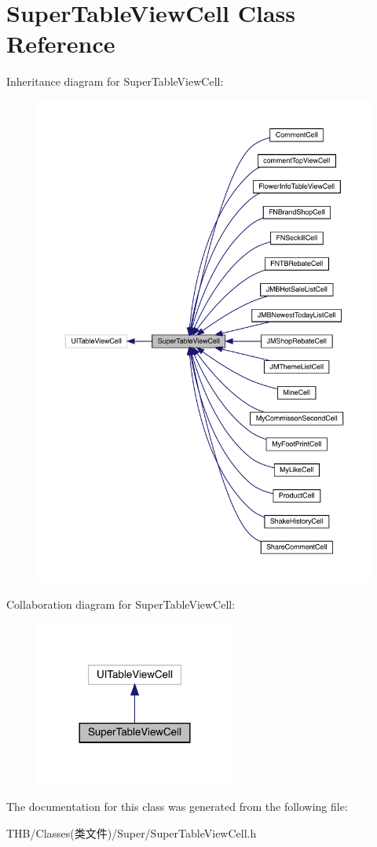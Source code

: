 \hypertarget{interface_super_table_view_cell}{}\section{Super\+Table\+View\+Cell Class Reference}
\label{interface_super_table_view_cell}


Inheritance diagram for Super\+Table\+View\+Cell\+:\nopagebreak
\begin{figure}[H]
\begin{center}
\leavevmode
\includegraphics[width=350pt]{interface_super_table_view_cell__inherit__graph}
\end{center}
\end{figure}


Collaboration diagram for Super\+Table\+View\+Cell\+:\nopagebreak
\begin{figure}[H]
\begin{center}
\leavevmode
\includegraphics[width=185pt]{interface_super_table_view_cell__coll__graph}
\end{center}
\end{figure}


The documentation for this class was generated from the following file\+:\begin{DoxyCompactItemize}
\item 
T\+H\+B/\+Classes(类文件)/\+Super/Super\+Table\+View\+Cell.\+h\end{DoxyCompactItemize}
